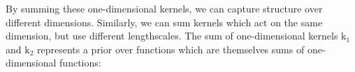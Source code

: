 \documentclass[a4paper,12pt ]{report}
\begin{document}
\begin{center}

\end{center}%
\begin{center}

\end{center}

By summing these one-dimensional kernels, we can capture structure over different dimensions. Similarly, we can sum kernels which act on the same dimension, but use different lengthscales. The sum of one-dimensional kernels $\mathrm{k_1}$ and $\mathrm{k_2}$ represents a prior over functions which are themselves sums of one-dimensional functions:
\end{document}
